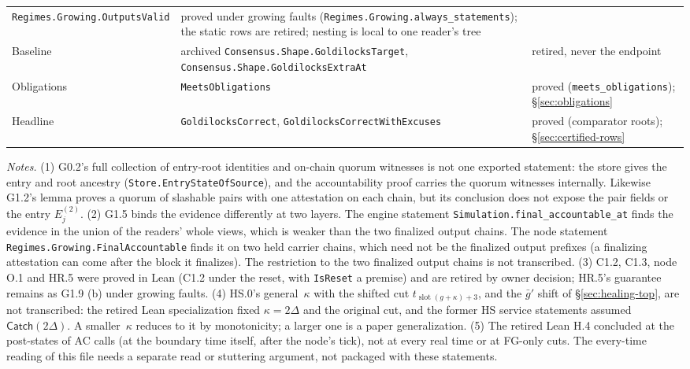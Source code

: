 \documentclass{article}
\newcommand{\slot}{\operatorname{slot}}
\begin{document}
{\begin{longtable}{@{}>{\raggedright\arraybackslash}p{1.6cm}>{\raggedright\arraybackslash}p{6.2cm}>{\raggedright\arraybackslash}p{5.2cm}@{}}
  \texttt{Regimes.Growing.OutputsValid} & proved under growing faults
  (\texttt{Regimes.Growing.always\_statements}); the static rows are
  retired; nesting is local to one reader's tree\\
Baseline & archived \texttt{Consensus.Shape.GoldilocksTarget},
  \texttt{Consensus.Shape.GoldilocksExtraAt} & retired, never the endpoint\\
Obligations & \texttt{MeetsObligations} & proved
  (\texttt{meets\_obligations}); \S\ref{sec:obligations}\\
Headline & \texttt{GoldilocksCorrect}, \texttt{GoldilocksCorrectWithExcuses}
  & proved (comparator roots); \S\ref{sec:certified-rows}\\
\hline
\end{longtable}}

\emph{Notes.}
(1) G0.2's full collection of entry-root identities and on-chain quorum
witnesses is not one exported statement: the store gives the entry and root
ancestry (\texttt{Store.EntryStateOfSource}), and the accountability proof
carries the quorum witnesses internally.  Likewise G1.2's lemma proves a
quorum of slashable pairs with one attestation on each chain, but its
conclusion does not expose the pair fields or the entry $E^{(2)}_j$.
(2) G1.5 binds the evidence differently at two layers.  The engine statement
\texttt{Simulation.final\_accountable\_at} finds the evidence in the union of
the readers' whole views, which is weaker than the two finalized output
chains.  The node statement \texttt{Regimes.Growing.FinalAccountable} finds it
on two held carrier chains, which need not be the finalized output prefixes (a
finalizing attestation can come after the block it finalizes).  The restriction to
the two finalized output chains is not transcribed.
(3) C1.2, C1.3, node O.1 and HR.5 were proved in Lean (C1.2 under the
reset, with \texttt{IsReset} a premise) and are retired by owner decision;
HR.5's guarantee remains as G1.9 (b) under growing faults.
(4) HS.0's general~$\kappa$ with the shifted cut
$t_{\slot(g+\kappa)+3}$, and the $\bar g'$ shift of
\S\ref{sec:healing-top}, are not transcribed: the retired Lean specialization
fixed $\kappa=2\Delta$ and the original cut, and the former HS service
statements assumed $\mathsf{Catch}(2\Delta)$.  A smaller~$\kappa$ reduces to it by
monotonicity; a larger one is a paper generalization.
(5) The retired Lean H.4 concluded at the post-states of AC calls (at the boundary
time itself, after the node's tick), not at every
real time or at FG-only cuts.  The every-time reading of this file needs a
separate read or stuttering argument, not packaged with these statements.
\end{document}
